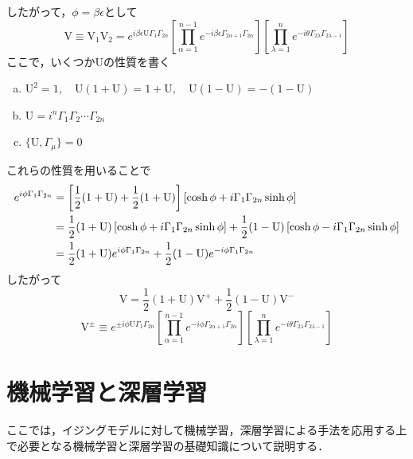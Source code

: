 \documentclass[a4paper,11pt]{jsreport}
\begin{document}
したがって，$\phi = \beta \epsilon$として
\begin{equation}
  \mathrm{V} \equiv \mathrm{V}_1 \mathrm{V}_2
  = e^{i \beta \epsilon \mathrm{U} \Gamma_1 \Gamma_{2n}}\left[ \prod_{\alpha=1}^{n-1} e^{-i \beta \epsilon \Gamma_{2\alpha+1} \Gamma_{2\alpha}} \right] \left[ \prod_{\lambda=1}^{n} e^{-i \theta \Gamma_{2\lambda} \Gamma_{2\lambda-1}} \right]
\end{equation}
ここで，いくつか$\mathrm{U}$の性質を書く
\begin{enumerate}[(a)]
  \item $\mathrm{U}^2 = 1, \quad \mathrm{U}(1 + \mathrm{U}) = 1 + \mathrm{U}, \quad \mathrm{U}(1 - \mathrm{U}) = -(1 - \mathrm{U})$
  \item $\mathrm{U} = i^n \Gamma_1 \Gamma_2 \cdots \Gamma_{2n}$
  \item $\{\mathrm{U}, \Gamma_{\mu}\} = 0$
\end{enumerate}
これらの性質を用いることで
\begin{align}
  e^{i \phi \Gamma_1 \Gamma_{2n}}
  &= \left[\frac{1}{2} (1 + \mathrm{U}) + \frac{1}{2} (1 + \mathrm{U})\right]\left[\cosh{\phi} + i \Gamma_1 \Gamma_{2n} \sinh{\phi}\right]
  \notag \\
  &= \frac{1}{2} (1 + \mathrm{U})\left[\cosh{\phi} + i \Gamma_1 \Gamma_{2n} \sinh{\phi}\right]
  + \frac{1}{2} (1 - \mathrm{U})\left[\cosh{\phi} - i \Gamma_1 \Gamma_{2n} \sinh{\phi}\right] \notag \\
  &= \frac{1}{2} (1 + \mathrm{U}) e^{i \phi \Gamma_1 \Gamma_{2n}}
  + \frac{1}{2} (1 - \mathrm{U}) e^{-i \phi \Gamma_1 \Gamma_{2n}}
\end{align}
したがって
\begin{equation}
  \mathrm{V} 
  = \frac{1}{2} (1 + \mathrm{U}) \mathrm{V}^+
  + \frac{1}{2} (1 - \mathrm{U}) \mathrm{V}^-
\end{equation}
\begin{equation}
  \mathrm{V}^{\pm}
  \equiv e^{\pm i \phi \mathrm{U} \Gamma_1 \Gamma_{2n}}\left[ \prod_{\alpha=1}^{n-1} e^{-i \phi \Gamma_{2\alpha+1} \Gamma_{2\alpha}} \right] \left[ \prod_{\lambda=1}^{n} e^{-i \theta \Gamma_{2\lambda} \Gamma_{2\lambda-1}} \right]
\end{equation}

\chapter{機械学習と深層学習}
ここでは，イジングモデルに対して機械学習，深層学習による手法を応用する上で必要となる機械学習と深層学習の基礎知識について説明する．
\end{document}
